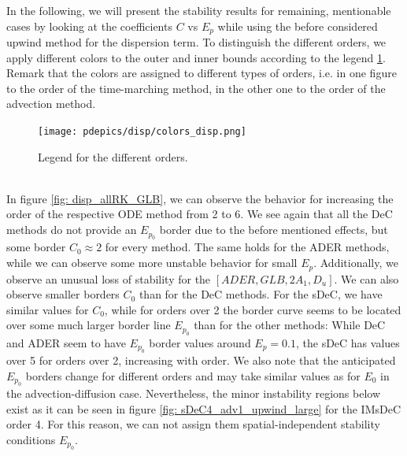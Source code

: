 In the following, we will present the stability results for remaining, mentionable cases by looking at the coefficients $C$ vs $E_p$ while using the before considered upwind method for the dispersion term. To distinguish the different orders, we apply different colors to the outer and inner bounds according to the legend \ref{fig: legend_disp}. Remark that the colors are assigned to different types of orders, i.e. in one figure to the order of the time-marching method, in the other one to the order of the advection method.
\begin{figure}[!h]
	\centering
	\texttt{[image: pdepics/disp/colors\_disp.png]}
	\caption{Legend for the different orders.}
	\label{fig: legend_disp}
\end{figure}\\

In figure \ref{fig: disp_allRK_GLB}, we can observe the behavior for increasing the order of the respective ODE method from 2 to 6. 
We see again that all the DeC methods do not provide an $E_{p_0}$ border due to the before mentioned effects, but some border $C_0\approx 2$ for every method. The same holds for the ADER methods, while we can observe some more unstable behavior for small $E_p$. Additionally, we observe an unusual loss of stability for the $[ADER, GLB, 2 A_1, D_u]$. We can also observe smaller borders $C_0$ than for the DeC methods. For the sDeC, we have similar values for $C_0$, while for orders over 2 the border curve seems to be located over some much larger border line $E_{p_0}$ than for the other methods: While DeC and ADER seem to have $E_{p_0}$ border values around $E_p=0.1$, the sDeC has values over 5 for orders over 2, increasing with order. We also note that the anticipated $E_{p_0}$ borders change for different orders and may take similar values as for $E_0$ in the advection-diffusion case. Nevertheless, the minor instability regions below exist as it can be seen in figure \ref{fig: sDeC4_adv1_upwind_large} for the IMsDeC order 4. For this reason, we can not assign them spatial-independent stability conditions $E_{p_0}$. 
